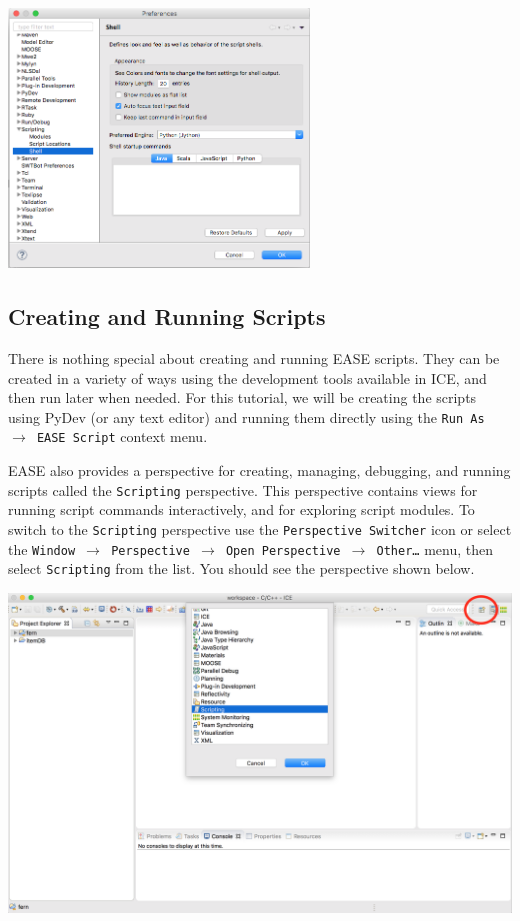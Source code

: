 \begin{center} \includegraphics[width=8cm]{images/scripting-prefs2}
\end{center}

\subsection{Creating and Running Scripts}

There is nothing special about creating and running EASE scripts. They can be
created in a variety of ways using the development tools available in ICE, and
then run later when needed. For this tutorial, we will be creating the scripts
using PyDev (or any text editor) and running them directly using the \texttt{Run As
$\rightarrow$ EASE Script} context menu.

EASE also provides a perspective for creating, managing, debugging, and running
scripts called the \texttt{Scripting} perspective. This perspective contains
views for running script commands interactively, and for exploring script modules.
To switch to the \texttt{Scripting} perspective use the \texttt{Perspective
Switcher} icon or select the \texttt{Window $\rightarrow$ Perspective
$\rightarrow$ Open Perspective $\rightarrow$ Other\ldots} menu, then select 
\texttt{Scripting} from the list. You should see the perspective shown below.

\begin{center} \includegraphics[width=\textwidth]{images/perspective}
\end{center}

